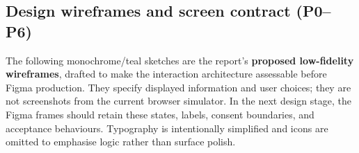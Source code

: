\documentclass[12pt,a4paper]{article}
\begin{document}
\clearpage
\subsection{Design wireframes and screen contract (P0--P6)}
The following monochrome/teal sketches are the report's \textbf{proposed low-fidelity wireframes}, drafted to make the interaction architecture assessable before Figma production. They specify displayed information and user choices; they are not screenshots from the current browser simulator. In the next design stage, the Figma frames should retain these states, labels, consent boundaries, and acceptance behaviours. Typography is intentionally simplified and icons are omitted to emphasise logic rather than surface polish.

\newcommand{\wirefield}[2]{\par\vspace{0.28em}{\footnotesize\color{Slate}\textbf{#1}}\par\vspace{0.08em}\fcolorbox{RuleGray}{white}{\parbox[c][0.52cm][c]{0.90\linewidth}{\hspace{0.35em}\footnotesize #2}}\par}
\newcommand{\wirebtn}[1]{\par\vspace{0.45em}\colorbox{Navy}{\parbox[c][0.49cm][c]{0.94\linewidth}{\centering\footnotesize\bfseries\color{white}#1}}\par}
\newcommand{\wirenote}[1]{\par\vspace{0.3em}{\footnotesize\color{Slate}#1}\par}
\newcommand{\wireframe}[3]{%
\begin{minipage}[t]{0.48\textwidth}
\begin{tcolorbox}[enhanced,colback=RowGray!25,colframe=RuleGray,boxrule=0.75pt,arc=1.1mm,width=\linewidth,height=9.2cm,valign=top,left=8pt,right=8pt,top=7pt,bottom=5pt]
{\small\sffamily\bfseries\color{Teal}#1}\par\vspace{0.3em}
{\normalsize\sffamily\bfseries\color{Navy}#2}\par\vspace{0.35em}\hrule\vspace{0.35em}
#3
\end{tcolorbox}
\end{minipage}}
\end{document}
